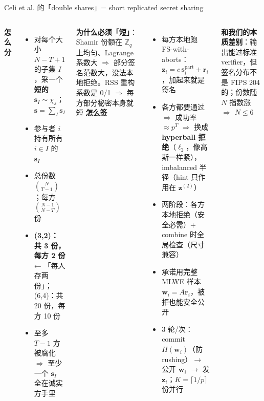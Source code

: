 \documentclass[aspectratio=169,10pt,fontset=none]{ctexbeamer}
\begin{document}
\begin{frame}{Celi et al. 的「double shares」= short replicated secret sharing}
\begin{columns}[T]
\textbf{怎么分}
\begin{itemize}
  \item 对每个大小 $N-T+1$ 的子集 $I$，采一个\textbf{短的} $\mathbf s_I\sim\chi_s$；$\mathbf s=\sum_I \mathbf s_I$
  \item 参与者 $i$ 持有所有 $i\in I$ 的 $\mathbf s_I$
  \item 总份数 $\binom{N}{T-1}$；每方 $\binom{N-1}{N-T}$ 份
  \item \textbf{(3,2)：共 3 份，每方 2 份} ← 「每人存两份」；(6,4)：共 20 份，每方 10 份
  \item 至多 $T-1$ 方被腐化 $\Rightarrow$ 至少一个 $\mathbf s_I$ 全在诚实方手里
\end{itemize}
\textbf{为什么必须「短」}：Shamir 份额在 $\mathbb Z_q$ 上均匀、Lagrange 系数大 $\Rightarrow$ 部分签名范数大，没法本地拒绝。RSS 重构系数是 0/1 $\Rightarrow$ 每方部分秘密本身就短
\textbf{怎么签}
\begin{itemize}
  \item 每方本地跑 FS-with-aborts：$\mathbf z_i=c\,\mathbf s_i^{\mathrm{part}}+\mathbf r_i$，加起来就是签名
  \item 各方都要通过 $\Rightarrow$ 成功率 $\approx p^T$ $\Rightarrow$ 换成 \textbf{hyperball 拒绝}（$\ell_2$，像高斯一样紧），imbalanced 半径（hint 只作用在 $\mathbf z^{(2)}$）
  \item 两阶段：各方本地拒绝（安全必需）+ combine 时全局检查（尺寸兼容）
  \item 承诺用完整 MLWE 样本 $\mathbf w_i=A\mathbf r_i$，被拒也能安全公开
  \item 3 轮/次：commit $H(\mathbf w_i)$（防 rushing）$\to$ 公开 $\mathbf w_i$ $\to$ 发 $\mathbf z_i$；$K=\lceil1/p\rceil$ 份并行
\end{itemize}
\textbf{和我们的本质差别}：输出能过标准 verifier，但\alert{签名分布不是 FIPS 204 的}；份数随 $N$ 指数涨 $\Rightarrow$ $N\le6$
\end{columns}
\end{frame}
\end{document}
